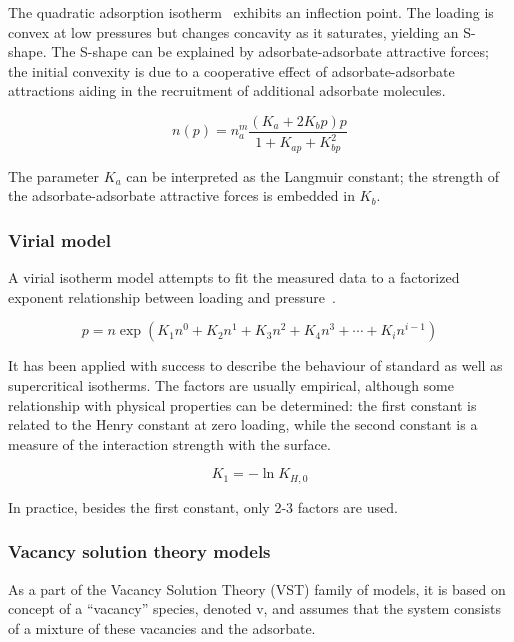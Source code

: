The quadratic adsorption
isotherm~\cite{hillIntroductionStatisticalThermodynamics1986}
exhibits an inflection point. The loading is convex at low
pressures but changes concavity as it saturates, yielding
an S-shape. The S-shape can be explained by adsorbate-adsorbate
attractive
forces; the initial convexity is due to a cooperative
effect of adsorbate-adsorbate attractions aiding in the recruitment
of
additional adsorbate molecules.

\begin{equation}\label{pyg:eqn:quad}
	n(p) = n_a^m \frac{(K_a + 2 K_b p)p}{1+K_{ap} + K_{bp}^2}
\end{equation}

The parameter \(K_a\) can be interpreted as the Langmuir constant;
the
strength of the adsorbate-adsorbate attractive forces is embedded in
\(K_b\).

\subsubsection{Virial model}\label{pyg:models:virial}

A virial isotherm model attempts to fit the measured data to a
factorized
exponent relationship between loading and
pressure~\cite{myersThermodynamicsAdsorptionPorous2002}.

\begin{equation}\label{pyg:eqn:virial}
	p = n \exp{(K_1n^0 + K_2n^1 + K_3n^2 + K_4n^3 + \cdots + K_i
		n^{i-1})}
\end{equation}

It has been applied with success to describe the behaviour of
standard as
well as supercritical isotherms. The factors are usually empirical,
although some relationship with physical properties can be
determined:
the first constant is related to the Henry constant at zero loading,
while
the second constant is a measure of the interaction strength with the
surface.

\begin{equation}
	K_1 = -\ln{K_{H,0}}
\end{equation}

In practice, besides the first constant, only 2-3 factors are used.

\subsubsection{Vacancy solution theory models}\label{pyg:models:vst}

As a part of the Vacancy Solution Theory (VST) family of models, it
is based on concept
of a “vacancy” species, denoted v, and assumes that the system
consists of a
mixture of these vacancies and the adsorbate.

